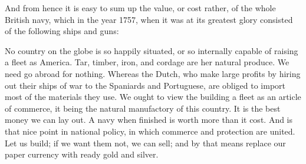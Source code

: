 \documentclass[12pt, twocolumn]{book}
\begin{document}
    \bigskip

    And from hence it is easy to sum up the value, or cost rather, of the whole British navy, which in the year 1757, when it was at its greatest glory consisted of the following ships and guns:

    \bigskip


    \bigskip

    No country on the globe is so happily situated, or so internally capable of raising a fleet as America. Tar, timber, iron, and cordage are her natural produce. We need go abroad for nothing. Whereas the Dutch, who make large profits by hiring out their ships of war to the Spaniards and Portuguese, are obliged to import most of the materials they use. We ought to view the building a fleet as an article of commerce, it being the natural manufactory of this country. It is the best money we can lay out. A navy when finished is worth more than it cost. And is that nice point in national policy, in which commerce and protection are united. Let us build; if we want them not, we can sell; and by that means replace our paper currency with ready gold and silver.
\end{document}
